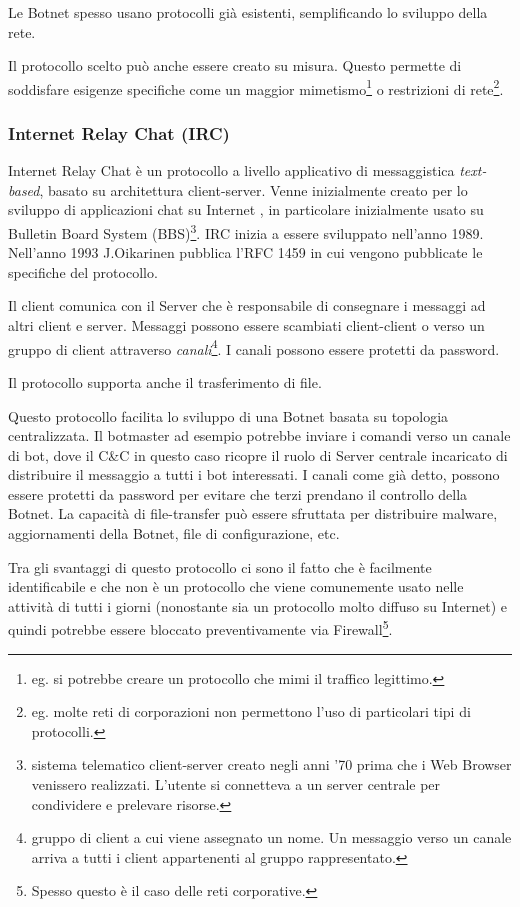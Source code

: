 Le Botnet spesso usano protocolli già esistenti, semplificando lo sviluppo della rete.

Il protocollo scelto può anche essere creato su misura. Questo permette di soddisfare  esigenze specifiche come un maggior mimetismo\footnote{eg. si potrebbe creare un protocollo che mimi il traffico legittimo.}  o restrizioni di rete\footnote{eg. molte reti di corporazioni non permettono l'uso di particolari tipi di protocolli.}.

\subsubsection{Internet Relay Chat (IRC)}
\label{IRC}
Internet Relay Chat  è un protocollo a livello applicativo di messaggistica \textit{text-based}, basato su architettura client-server. Venne inizialmente creato  per lo sviluppo di applicazioni chat su Internet \cite{rfc1459}, in particolare inizialmente usato su Bulletin Board System (BBS)\footnote{sistema telematico client-server creato negli anni '70 prima che i Web Browser venissero realizzati. L'utente si connetteva a un server centrale per condividere e prelevare risorse.}.
IRC inizia a essere sviluppato nell'anno 1989. Nell'anno 1993 J.Oikarinen pubblica l'RFC 1459 in cui vengono pubblicate le specifiche del protocollo.

Il client comunica con il Server che è responsabile di consegnare i messaggi ad altri client e server.
Messaggi possono essere scambiati  client-client o verso un gruppo di client attraverso \textit{canali}\footnote{gruppo di client a cui viene assegnato un nome. Un messaggio verso un canale arriva a tutti i client appartenenti al gruppo rappresentato.}. I canali possono essere protetti da password. 

Il protocollo supporta anche il trasferimento di file.

Questo protocollo facilita lo sviluppo di una Botnet basata su topologia centralizzata. Il botmaster ad esempio potrebbe inviare i comandi verso un canale di bot, dove il C\&C in questo caso ricopre il ruolo di Server centrale incaricato di distribuire il messaggio a tutti i bot interessati. I canali come già detto, possono essere protetti da password per evitare che terzi prendano il controllo della Botnet. La capacità di file-transfer può essere sfruttata per distribuire malware, aggiornamenti della Botnet, file di configurazione, etc.

Tra gli svantaggi di questo protocollo ci sono il fatto che è facilmente identificabile e che non è un protocollo che viene comunemente usato nelle attività di tutti i giorni (nonostante sia un protocollo molto diffuso su Internet) e quindi potrebbe essere bloccato preventivamente via Firewall\footnote{Spesso questo è il caso delle reti corporative.}.

